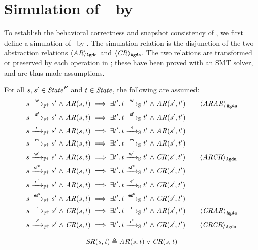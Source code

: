 
\section{Simulation of~\ProgInv\ by~\Spec}
\label{sec:sim}
To establish the behavioral correctness and snapshot consistency of \ProgInv, we first define a simulation of \ProgInv\ by \Spec. The simulation relation is the disjunction of the two abstraction relations $\langle \mathit{AR} \rangle_\mathtt{Agda}$ and $\langle \mathit{CR} \rangle_\mathtt{Agda}$. The two relations are transformed or preserved by each operation in \ProgInv; these have been proved with an SMT solver, and are thus made assumptions.
\begin{assumption}\label{peropa}
	For all $s, s' \in \mathit{State}^P$ and $t \in \mathit{State}$, the following are assumed:
\begin{align*}
s \ttPI{\awa{\actw}{\actw }} s' \conj \i{AR}(s, t) &\implies \exists t' \ldotp t \ttS{\awa{\actw}{\actw }} t' \conj \i{AR}(s', t') \tag*{\AgdaId{\id{ARAR}}}\\
s \ttPI{\awa{\actw}{\actf }} s' \conj \i{AR}(s, t) &\implies \exists t' \ldotp t \ttS{\awa{\actw}{\actf }} t' \conj \i{AR}(s', t')\\
s \ttPI{\awa{\actw}{\actcp}} s' \conj \i{AR}(s, t) &\implies \exists t' \ldotp t \ttS{\awa{\actw}{\actcp}} t' \conj \i{AR}(s', t')\\
s \ttPI{\awa{\actw}{\actes}} s' \conj \i{AR}(s, t) &\implies \exists t' \ldotp t \ttS{\awa{\actw}{\actes}} t' \conj \i{AR}(s', t')\\
s \ttPI{\awa{\actw}{\actwc}} s' \conj \i{AR}(s, t) &\implies \exists t' \ldotp t \ttS{\awa{\actw}{\actwc}} t' \conj \i{CR}(s', t')\tag*{\AgdaId{\id{ARCR}}}\\
s \ttPI{\awa{\actw}{\actfc}} s' \conj \i{AR}(s, t) &\implies \exists t' \ldotp t \ttS{\awa{\actw}{\actfc}} t' \conj \i{CR}(s', t')\\
s \ttPI{\awa{\actw}{\actcpc}} s' \conj \i{AR}(s, t) &\implies \exists t' \ldotp t \ttS{\awa{\actw}{\actcpc}} t' \conj \i{CR}(s', t')\\
s \ttPI{\awa{\actw}{\actesc}} s' \conj \i{AR}(s, t) &\implies \exists t' \ldotp t \ttS{\awa{\actw}{\actesc}} t' \conj \i{CR}(s', t')\\
s \ttPI{\awa{\actw}{\actr }} s' \conj \i{CR}(s, t) &\implies \exists t' \ldotp t \ttS{\awa{\actw}{\actr }} t' \conj \i{AR}(s', t')\tag*{\AgdaId{\id{CRAR}}}\\
s \ttPI{\awa{\actw}{\actrc}} s' \conj \i{CR}(s, t) &\implies \exists t' \ldotp t \ttS{\awa{\actw}{\actrc}} t' \conj \i{CR}(s', t')\tag*{\AgdaId{\id{CRCR}}}
\end{align*}
\end{assumption}
\begin{definition}
    $$\mathit{SR(s, t)} {}\triangleq{} \mathit{AR(s, t)} \lor \mathit{CR(s, t)}$$
\end{definition}

